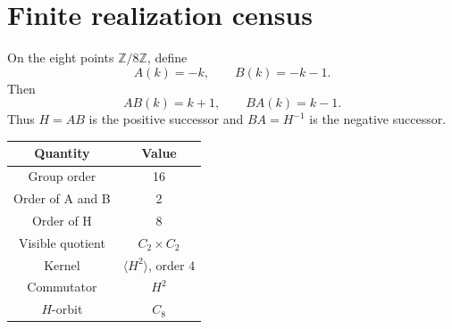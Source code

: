 \section{Finite realization census}

On the eight points \(\mathbb{Z}/8\mathbb{Z}\), define
\[
A(k)=-k,
\qquad
B(k)=-k-1.
\]
Then
\[
AB(k)=k+1,
\qquad
BA(k)=k-1.
\]
Thus \(H=AB\) is the positive successor and \(BA=H^{-1}\) is the
negative successor.

\begin{center}
\begin{tabular}{c|c}
Quantity & Value\\
\hline
Group order & 16\\
Order of A and B & 2\\
Order of H & 8\\
Visible quotient & \(C_2\times C_2\)\\
Kernel & \(\langle H^2\rangle\), order 4\\
Commutator & \(H^2\)\\
\(H\)-orbit & \(C_8\)
\end{tabular}
\end{center}
